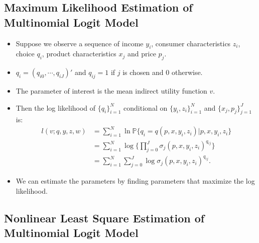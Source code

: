\documentclass[
]{book}
\providecommand{\tightlist}{%
  \setlength{\itemsep}{0pt}\setlength{\parskip}{0pt}}
\begin{document}
\hypertarget{maximum-likelihood-estimation-of-multinomial-logit-model}{%
\subsection{Maximum Likelihood Estimation of Multinomial Logit Model}\label{maximum-likelihood-estimation-of-multinomial-logit-model}}

\begin{itemize}
\tightlist
\item
  Suppose we observe a sequence of income \(y_i\), consumer characteristics \(z_i\), choice \(q_{i}\), product characteristics \(x_j\) and price \(p_j\).
\item
  \(q_i = (q_{i0}, \cdots, q_{iJ})'\) and \(q_{ij} = 1\) if \(j\) is chosen and \(0\) otherwise.
\item
  The parameter of interest is the mean indirect utility function \(v\).
\item
  Then the log likelihood of \(\{q_i\}_{i = 1}^N\) conditional on \(\{y_i, z_i\}_{i = 1}^N\) and \(\{x_j,p_j\}_{j = 1}^J\) is:
  \begin{equation}
  \begin{split}
  l(v; q, y, z, w) &= \sum_{i = 1}^N \ln \mathbb{P}\{q_i = q(p, x, y_i, z_i)|p, x, y_i, z_i\}\\
  & = \sum_{i = 1}^N \log \Bigg\{ \prod_{j = 0}^{J} \sigma_{j}(p, x, y_i, z_i)^{q_{ij}} \Bigg\}\\
  &= \sum_{i = 1}^N \sum_{j = 0}^J \log \sigma_{j}(p, x, y_i, z_i)^{q_{ij}}.
  \end{split}
  \end{equation}
\item
  We can estimate the parameters by finding parameters that maximize the log likelihood.
\end{itemize}

\hypertarget{nonlinear-least-square-estimation-of-multinomial-logit-model}{%
\subsection{Nonlinear Least Square Estimation of Multinomial Logit Model}\label{nonlinear-least-square-estimation-of-multinomial-logit-model}}
\end{document}
